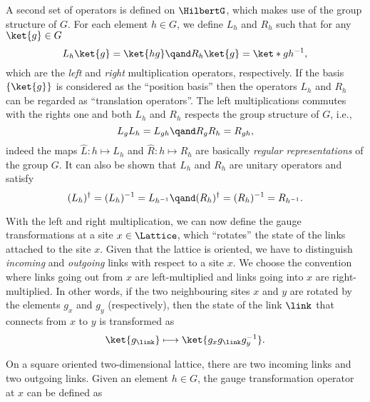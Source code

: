 \medskip

A second set of operators is defined on $\HilbertG$, which makes use of the group structure of $G$.
For each element $h \in G$, we define $L_h$ and $R_h$ such that for any $\ket{g} \in G$
\begin{equation}
    L_h \ket{g} = \ket{hg}
    \qand
    R_h \ket{g} = \ket*{gh^{-1}},
    \label{eq:left_right_translations}
\end{equation}
which are the \emph{left} and \emph{right} multiplication operators, respectively.
If the basis $\{\ket{g}\}$ is considered as the ``position basis'' then the operators $L_h$ and $R_h$ can be regarded as ``translation operators''.
The left multiplications commutes with the rights one and both $L_h$ and $R_h$ respects the group structure of $G$, i.e.,
\begin{equation}
    L_g L_h = L_{gh}
    \qand
    R_g R_h = R_{gh},
\end{equation}
indeed the maps $\hat{L}: h \mapsto L_h$ and $\hat{R}: h \mapsto R_h$ are basically \emph{regular representations} of the group $G$.
It can also be shown that $L_h$ and $R_h$ are unitary operators and satisfy
\begin{equation}
    (L_h)^{\dagger} = (L_h)^{-1} = L_{h^{-1}}
    \qand
    (R_h)^{\dagger} = (R_h)^{-1} = R_{h^{-1}}.
\end{equation}


\medskip


With the left and right multiplication, we can now define the gauge transformations at a site $x \in \Lattice$, which ``rotates'' the state of the links attached to the site $x$.
Given that the lattice is oriented, we have to distinguish \emph{incoming} and \emph{outgoing} links with respect to a site $x$.
We choose the convention where links going out from $x$ are left-multiplied and links going into $x$ are right-multiplied.
In other words, if the two neighbouring sites $x$ and $y$ are rotated by the elements $g_x$ and $g_y$ (respectively), then the state of the link $\link$ that connects from $x$ to $y$ is transformed as
\begin{equation}
    \ket{g_{\link}}  \longmapsto  \ket{g_x g_{\link} g_y^{-1}}.
\end{equation}

On a square oriented two-dimensional lattice, there are two incoming links and two outgoing links.
Given an element $h \in G$, the gauge transformation operator at $x$ can be defined as



